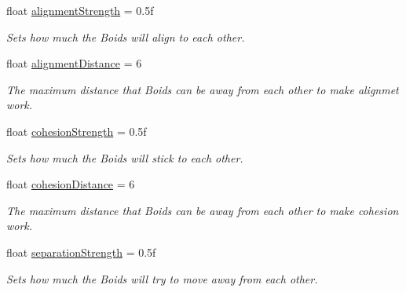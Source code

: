 \begin{DoxyCompactItemize}
float \hyperlink{class_f_unit_manager_a6fffed9f8949e5908b5ff789779b8abb}{alignment\+Strength} = 0.\+5f
\begin{DoxyCompactList}\small\item\em Sets how much the Boids will align to each other. \end{DoxyCompactList}\item 
\mbox{\label{class_f_unit_manager_a58ef6cb569af68ab076ea7ba13920620}} 
float \hyperlink{class_f_unit_manager_a58ef6cb569af68ab076ea7ba13920620}{alignment\+Distance} = 6
\begin{DoxyCompactList}\small\item\em The maximum distance that Boids can be away from each other to make alignmet work. \end{DoxyCompactList}\item 
\mbox{\label{class_f_unit_manager_ab81d3274a3cd1fbd52bea96df052dac4}} 
float \hyperlink{class_f_unit_manager_ab81d3274a3cd1fbd52bea96df052dac4}{cohesion\+Strength} = 0.\+5f
\begin{DoxyCompactList}\small\item\em Sets how much the Boids will stick to each other. \end{DoxyCompactList}\item 
\mbox{\label{class_f_unit_manager_a4288c71deee22c3f89aa418ea31294bb}} 
float \hyperlink{class_f_unit_manager_a4288c71deee22c3f89aa418ea31294bb}{cohesion\+Distance} = 6
\begin{DoxyCompactList}\small\item\em The maximum distance that Boids can be away from each other to make cohesion work. \end{DoxyCompactList}\item 
\mbox{\label{class_f_unit_manager_a592278d1412ee25871d11b26cfca66e6}} 
float \hyperlink{class_f_unit_manager_a592278d1412ee25871d11b26cfca66e6}{separation\+Strength} = 0.\+5f
\begin{DoxyCompactList}\small\item\em Sets how much the Boids will try to move away from each other. \end{DoxyCompactList}\item 
\mbox{\label{class_f_unit_manager_a99ced2e66851fd9dc1356935710cb315}} 

\end{DoxyCompactItemize}
